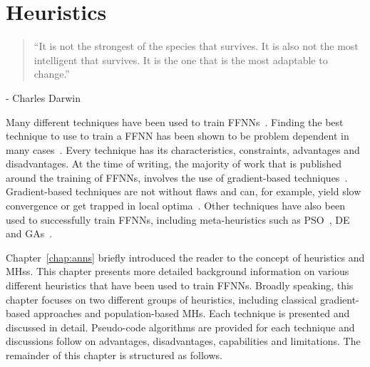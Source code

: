 \chapter{Heuristics}\label{chap:heuristics}

\begin{quotation}
      ``It is not the strongest of the species that survives. It is also not the most intelligent that survives. It is the one that is the most adaptable to change.''
\end{quotation}
\begin{flushright}
      - Charles Darwin
\end{flushright}

Many different techniques have been used to train \acp{FFNN}~\cite{ref:kingma:2014}. Finding the best technique to use to train a \acs{FFNN} has been shown to be problem dependent in many cases~\cite{ref:kheiri:2017}. Every technique has its characteristics, constraints, advantages and disadvantages. At the time of writing, the majority of work that is published around the training of \acp{FFNN}, involves the use of gradient-based techniques~\cite{ref:nel:2021}. Gradient-based techniques are not without flaws and can, for example, yield slow convergence or get trapped in local optima~\cite{ref:mingguang:2009}. Other techniques have also been used to successfully train \acp{FFNN}, including meta-heuristics such as \acf{PSO}~\cite{ref:rakitianskaia:2012, ref:vanwyk:2014}, \acf{DE}~\cite{ref:espinal:2011} and \acfp{GA}~\cite{ref:gupta:1999}.

Chapter~\ref{chap:anns} briefly introduced the reader to the concept of heuristics and \acfp{MH}s. This chapter presents more detailed background information on various different heuristics that have been used to train \acp{FFNN}. Broadly speaking, this chapter focuses on two different groups of heuristics, including classical gradient-based approaches and population-based \acp{MH}. Each technique is presented and discussed in detail. Pseudo-code algorithms are provided for each technique and discussions follow on advantages, disadvantages, capabilities and limitations. The remainder of this chapter is structured as follows.

